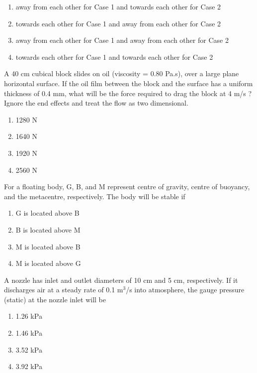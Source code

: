  \begin{enumerate}
    \item away from each other for Case 1 and towards each other for Case 2
    \item towards each other for Case 1 and away from each other for Case 2
    \item away from each other for Case 1 and away from each other for Case 2
    \item towards each other for Case 1 and towards each other for Case 2 \\
 \end{enumerate}
\item A 40 cm cubical block slides on oil (viscosity = 0.80 Pa.s), over a large plane horizontal surface. If the oil film between the block and the surface has a uniform thickness of 0.4 mm, what will be the force required to drag the block at 4 m/s ? Ignore the end effects and treat the flow as two dimensional.
\begin{enumerate}
     \item 1280 N
     \item 1640 N
     \item 1920 N
     \item 2560 N \\
 \end{enumerate}
\item For a floating body, G, B, and M represent centre of gravity, centre of buoyancy, and the metacentre, respectively. The body will be stable if
\begin{enumerate}
    \item G is located above B
    \item B is located above M
    \item M is located above B
    \item M is located above G \\
\end{enumerate}
\item A nozzle has inlet and outlet diameters of 10 cm and 5 cm, respectively. If it discharges air at a steady rate of 0.1 $\text{m}^3$/s into atmosphere, the gauge pressure (static) at the nozzle inlet will be
\begin{enumerate}
    \item 1.26 kPa
    \item 1.46 kPa
    \item 3.52 kPa
    \item 3.92 kPa \\
\end{enumerate}
